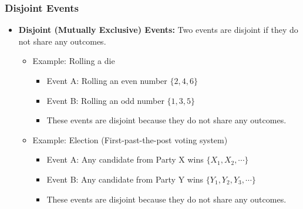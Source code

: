 \documentclass[handout]{beamer} %
\begin{document}
\begin{frame}
    \frametitle{Disjoint Events}
    \begin{itemize}
        \item \textbf{Disjoint (Mutually Exclusive) Events:} Two events are disjoint if they do not share any outcomes.
        \pause
        \begin{itemize}
            \item Example: Rolling a die \pause
            \begin{itemize}
                \item Event A: Rolling an even number $\{2, 4, 6\}$ \pause
                \item Event B: Rolling an odd number $\{1, 3, 5\}$ \pause
                \item These events are disjoint because they do not share any outcomes. \pause
            \end{itemize}
            \pause
            \item Example: Election (First-past-the-post voting system) \pause
            \begin{itemize}
                \item Event A: Any candidate from Party X wins $\{X_1, X_2, \cdots\}$ \pause
                \item Event B: Any candidate from Party Y wins $\{Y_1, Y_2, Y_3, \cdots\}$ \pause
                \item These events are disjoint because they do not share any outcomes.
            \end{itemize}
        \end{itemize}
    \end{itemize}
\end{frame}
\end{document}

